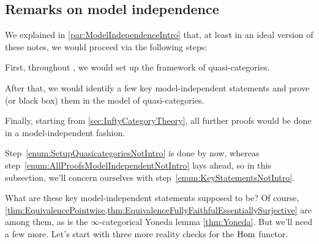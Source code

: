 \subsection{Remarks on model independence}

We explained in \cref{par:ModelIndependenceIntro} that, at least in an ideal version of these notes, we would proceed via the following steps:
\begin{alphanumerate}
	\item First, throughout , we would set up the framework of quasi-categories.\label{enum:SetupQuasicategoriesNotIntro}
	\item After that, we would identify a few key model-independent statements and prove (or black box) them in the model of quasi-categories.\label{enum:KeyStatementsNotIntro}
	\item Finally, starting from \cref{sec:InftyCategoryTheory}, all further proofs would be done in a model-independent fashion.\label{enum:AllProofsModelIndependentNotIntro}
\end{alphanumerate}
Step~\cref{enum:SetupQuasicategoriesNotIntro} is done by now, whereas step~\cref{enum:AllProofsModelIndependentNotIntro} lays ahead, so in this subsection, we'll concern ourselves with step~\cref{enum:KeyStatementsNotIntro}.
	
What are these key model-independent statements supposed to be? Of course, \cref{thm:EquivalencePointwise,thm:EquivalenceFullyFaithfulEssentiallySurjective} are among them, as is the $\infty$-categorical Yoneda lemma \cref{thm:Yoneda}. But we'll need a few more. Let's start with three more reality checks for the $\operatorname{Hom}$ functor.



